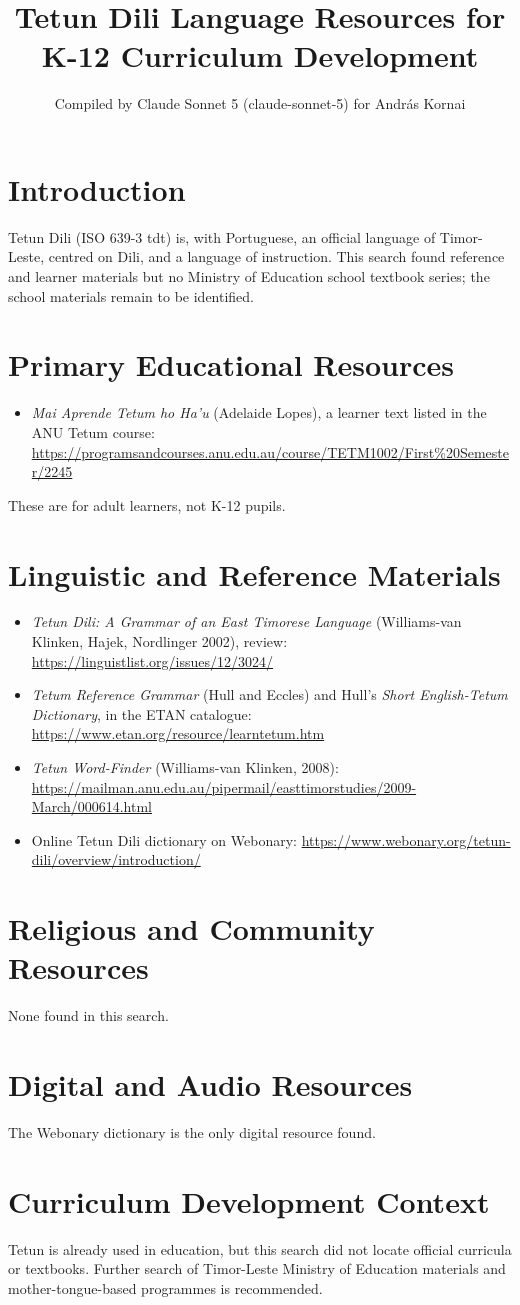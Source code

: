 \documentclass[12pt]{article}
\title{Tetun Dili Language Resources for K-12 Curriculum Development}
\author{Compiled by Claude Sonnet 5 (claude-sonnet-5) for Andr\'as Kornai}
\date{}
\begin{document}
\maketitle
\section{Introduction}
Tetun Dili (ISO 639-3 tdt) is, with Portuguese, an official language of Timor-Leste, centred on Dili, and a language of instruction. This search found reference and learner materials but no Ministry of Education school textbook series; the school materials remain to be identified.
\section{Primary Educational Resources}
\begin{itemize}
\item \emph{Mai Aprende Tetum ho Ha'u} (Adelaide Lopes), a learner text listed in the ANU Tetum course: \url{https://programsandcourses.anu.edu.au/course/TETM1002/First%20Semester/2245}
\end{itemize}
These are for adult learners, not K-12 pupils.
\section{Linguistic and Reference Materials}
\begin{itemize}
\item \emph{Tetun Dili: A Grammar of an East Timorese Language} (Williams-van Klinken, Hajek, Nordlinger 2002), review: \url{https://linguistlist.org/issues/12/3024/}
\item \emph{Tetum Reference Grammar} (Hull and Eccles) and Hull's \emph{Short English-Tetum Dictionary}, in the ETAN catalogue: \url{https://www.etan.org/resource/learntetum.htm}
\item \emph{Tetun Word-Finder} (Williams-van Klinken, 2008): \url{https://mailman.anu.edu.au/pipermail/easttimorstudies/2009-March/000614.html}
\item Online Tetun Dili dictionary on Webonary: \url{https://www.webonary.org/tetun-dili/overview/introduction/}
\end{itemize}
\section{Religious and Community Resources}
None found in this search.
\section{Digital and Audio Resources}
The Webonary dictionary is the only digital resource found.
\section{Curriculum Development Context}
Tetun is already used in education, but this search did not locate official curricula or textbooks. Further search of Timor-Leste Ministry of Education materials and mother-tongue-based programmes is recommended.
\end{document}
